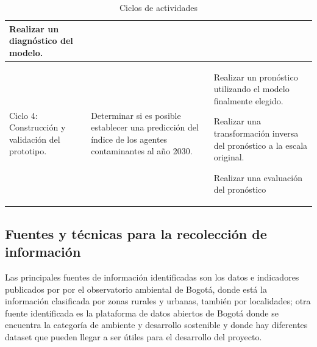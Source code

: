 \begin{table}[h]
\begin{center}
\begin{tabular}{| p{4cm} | p{4cm} | p{4cm} |}
			Realizar un diagnóstico del modelo.		\\ \hline
			
			
			Ciclo 4: Construcción y validación del prototipo.
			& Determinar si es posible establecer una predicción del índice de los agentes contaminantes al año 2030.		
			& Realizar un pronóstico utilizando el modelo finalmente elegido.
			
			Realizar una transformación inversa del pronóstico a la escala original.
			
			Realizar una evaluación del pronóstico	\\ \hline

		\end{tabular}
		\caption{Ciclos de actividades}
	\end{center}
\end{table}

\subsection{Fuentes y técnicas para la recolección de información}

Las principales fuentes de información identificadas son los datos e indicadores publicados por por el observatorio ambiental de Bogotá, donde está la información clasificada por zonas rurales y urbanas, también por localidades; otra fuente identificada es la plataforma de datos abiertos de Bogotá donde se encuentra la categoría de ambiente y desarrollo sostenible y donde hay diferentes dataset que pueden llegar a ser útiles para el desarrollo del proyecto.